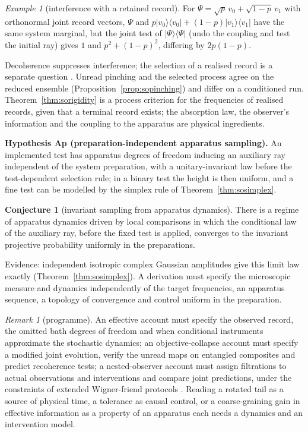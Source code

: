\documentclass[aps,pra,onecolumn,superscriptaddress,nofootinbib,10pt]{revtex4-2}
\theoremstyle{definition}
\newtheorem{conjecture}[theorem]{Conjecture}
\theoremstyle{remark}
\newtheorem{remark}[theorem]{Remark}
\newtheorem{example}[theorem]{Example}
\begin{document}
\begin{example}[interference with a retained record]\label{ex:sorecoherence}
For $\Psi=\sqrt p\,v_0+\sqrt{1-p}\,v_1$ with orthonormal joint record vectors, $\Psi$ and $p\lvert v_0\rangle\langle v_0\rvert+(1-p)\lvert v_1\rangle\langle v_1\rvert$ have the same
system marginal, but the joint test of $\lvert\Psi\rangle\langle\Psi\rvert$ (undo the coupling and test the initial ray) gives $1$ and $p^2+(1-p)^2$,
differing by $2p(1-p)$.
\end{example}
\noindent Decoherence suppresses interference; the selection of a realised record is a separate
question \cite{n3:Schlosshauer}.  Unread pinching and the selected process agree on the reduced ensemble
(Proposition~\ref{prop:sopinching}) and differ on a conditioned run.  Theorem~\ref{thm:sorigidity} is a process criterion
for the frequencies of realised records, given that a terminal record exists; the absorption law, the
observer's information and the coupling to the apparatus are physical ingredients.

\smallskip\noindent\textbf{Hypothesis Ap (preparation-independent apparatus sampling).}  An implemented test has
apparatus degrees of freedom inducing an auxiliary ray independent of the system preparation, with a
unitary-invariant law before the test-dependent selection rule; in a binary test the height is then
uniform, and a fine test can be modelled by the simplex rule of Theorem~\ref{thm:sosimplex}.

\begin{conjecture}[invariant sampling from apparatus dynamics]\label{conj:somixing}
There is a regime of apparatus dynamics driven by local comparisons in which the conditional law of the
auxiliary ray, before the fixed test is applied, converges to the invariant projective probability
uniformly in the preparations.
\end{conjecture}
\noindent Evidence: independent isotropic complex Gaussian amplitudes give this limit law exactly
(Theorem~\ref{thm:sosimplex}).  A derivation must specify the microscopic measure and dynamics independently of the
target frequencies, an apparatus sequence, a topology of convergence and control uniform in the
preparation.

\begin{remark}[programme]\label{rem:soprogramme}
An effective account must specify the observed record, the omitted bath degrees of freedom and when
conditional instruments approximate the stochastic dynamics; an objective-collapse account must specify a
modified joint evolution, verify the unread maps on entangled composites and predict recoherence tests; a
nested-observer account must assign filtrations to actual observations and interventions and compare
joint predictions, under the constraints of extended Wigner-friend protocols \cite{n3:FR,n3:Bong}.
Reading a rotated tail as a source of physical time, a tolerance as causal control, or a coarse-graining
gain in effective information \cite{n3:Hoel} as a property of an apparatus each needs a dynamics and an
intervention model.
\end{remark}
\end{document}
